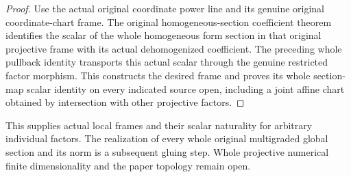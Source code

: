 \begin{proof}
Use the actual original coordinate power line and its genuine original coordinate-chart frame. The original homogeneous-section coefficient theorem identifies the scalar of the whole homogeneous form section in that original projective frame with its actual dehomogenized coefficient. The preceding whole pullback identity transports this actual scalar through the genuine restricted factor morphism. This constructs the desired frame and proves its whole section-map scalar identity on every indicated source open, including a joint affine chart obtained by intersection with other projective factors.
\end{proof}
This supplies actual local frames and their scalar naturality for arbitrary individual factors. The realization of every whole original multigraded global section and its norm is a subsequent gluing step. Whole projective numerical finite dimensionality and the paper topology remain open.
